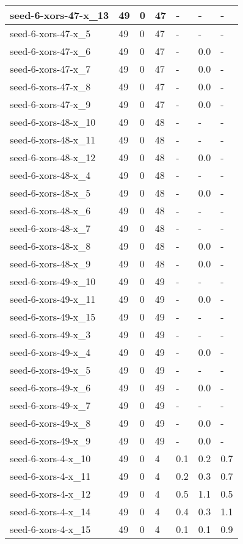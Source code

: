 \begin{scriptsize}
\begin{longtable}{|p{5cm}|l|l|l|l|l|l|}
seed-6-xors-47-x\_13&49&0&47&-&-&- \\ \hline 
seed-6-xors-47-x\_5&49&0&47&-&-&- \\ \hline 
seed-6-xors-47-x\_6&49&0&47&-&0.0&- \\ \hline 
seed-6-xors-47-x\_7&49&0&47&-&0.0&- \\ \hline 
seed-6-xors-47-x\_8&49&0&47&-&0.0&- \\ \hline 
seed-6-xors-47-x\_9&49&0&47&-&0.0&- \\ \hline 
seed-6-xors-48-x\_10&49&0&48&-&-&- \\ \hline 
seed-6-xors-48-x\_11&49&0&48&-&-&- \\ \hline 
seed-6-xors-48-x\_12&49&0&48&-&0.0&- \\ \hline 
seed-6-xors-48-x\_4&49&0&48&-&-&- \\ \hline 
seed-6-xors-48-x\_5&49&0&48&-&0.0&- \\ \hline 
seed-6-xors-48-x\_6&49&0&48&-&-&- \\ \hline 
seed-6-xors-48-x\_7&49&0&48&-&-&- \\ \hline 
seed-6-xors-48-x\_8&49&0&48&-&0.0&- \\ \hline 
seed-6-xors-48-x\_9&49&0&48&-&0.0&- \\ \hline 
seed-6-xors-49-x\_10&49&0&49&-&-&- \\ \hline 
seed-6-xors-49-x\_11&49&0&49&-&0.0&- \\ \hline 
seed-6-xors-49-x\_15&49&0&49&-&-&- \\ \hline 
seed-6-xors-49-x\_3&49&0&49&-&-&- \\ \hline 
seed-6-xors-49-x\_4&49&0&49&-&0.0&- \\ \hline 
seed-6-xors-49-x\_5&49&0&49&-&-&- \\ \hline 
seed-6-xors-49-x\_6&49&0&49&-&0.0&- \\ \hline 
seed-6-xors-49-x\_7&49&0&49&-&-&- \\ \hline 
seed-6-xors-49-x\_8&49&0&49&-&0.0&- \\ \hline 
seed-6-xors-49-x\_9&49&0&49&-&0.0&- \\ \hline 
seed-6-xors-4-x\_10&49&0&4&0.1&0.2&0.7 \\ \hline 
seed-6-xors-4-x\_11&49&0&4&0.2&0.3&0.7 \\ \hline 
seed-6-xors-4-x\_12&49&0&4&0.5&1.1&0.5 \\ \hline 
seed-6-xors-4-x\_14&49&0&4&0.4&0.3&1.1 \\ \hline 
seed-6-xors-4-x\_15&49&0&4&0.1&0.1&0.9 \\ \hline 

\end{longtable}
\end{scriptsize}
